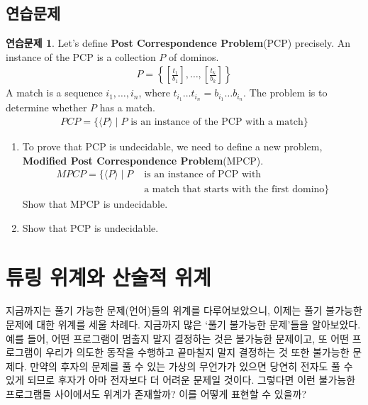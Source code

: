 \documentclass[b5paper, 11pt]{book}
\theoremstyle{definition}
\newtheorem{ec}{연습문제}[chapter]
\begin{document}
\section{연습문제}
\begin{ec}
    Let's define \textbf{Post Correspondence Problem}(PCP) precisely.
        An instance of the PCP is a collection $P$ of dominos.
    \begin{align*}
        P = \left\{\left[ \frac{t_1}{b_1} \right], \ldots ,\left[\frac{t_k}{b_k}\right] \right\}
    \end{align*}
    A match is a sequence $i_1, \ldots , i_n$, where $t_{i_1} \ldots t_{i_n} = b_{i_1} \ldots b_{i_n} $. The problem is to determine whether $P$ has a match. 
    \begin{align*}
        PCP = \{ \langle P \rangle \;\vert\; P \text{ is an instance of the PCP with a match}\}
    \end{align*}
    \begin{enumerate}
        \item     
        To prove that PCP is undecidable, we need to define a new problem, 
        \textbf{Modified Post Correspondence Problem}(MPCP). 
        \begin{align*}
            MPCP = \{\langle P \rangle \; \vert \; P &\text{ is an instance of PCP with} 
            \\ & \text{ a match that starts with the first domino} \}
        \end{align*}
        Show that MPCP is undecidable.
        \item Show that PCP is undecidable.
    \end{enumerate}
\end{ec}
\chapter{튜링 위계와 산술적 위계}
지금까지는 풀기 가능한 문제(언어)들의 위계를 다루어보았으니, 이제는 풀기 불가능한 문제에 대한 위계를 세울 차례다. 지금까지 많은 `풀기 불가능한 문제'들을 알아보았다. 예를 들어, 어떤 프로그램이 멈출지 말지 결정하는 것은 불가능한 문제이고, 또 어떤 프로그램이 우리가 의도한 동작을 수행하고 끝마칠지 말지 결정하는 것 또한 불가능한 문제다. 만약의 후자의 문제를 풀 수 있는 가상의 무언가가 있으면 당연히 전자도 풀 수 있게 되므로 후자가 아마 전자보다 더 어려운 문제일 것이다. 그렇다면 이런 불가능한 프로그램들 사이에서도  위계가 존재할까? 이를 어떻게 표현할 수 있을까?
\end{document}
